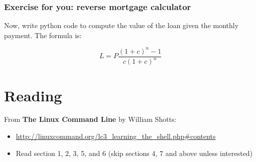 \documentclass[12pt,letterpaper,twoside]{article}
\begin{document}
\subsubsection{Exercise for you: reverse mortgage calculator}

Now, write python code to compute the value of the loan given the
monthly payment. The formula is:

\[
L = P \frac{(1+c)^n-1}{c(1+c)^n}
\]

\section{Reading}
From \textbf{The Linux Command Line} by William Shotts: 

\begin{itemize}
\item \url{http://linuxcommand.org/lc3_learning_the_shell.php\#contents}
\item Read section 1, 2, 3, 5, and 6 (skip sections 4, 7 and above unless
interested)
\end{itemize}






\end{document}
